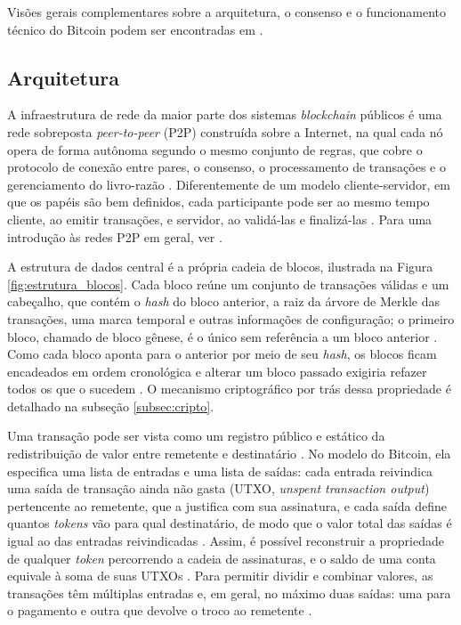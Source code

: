 Visões gerais complementares sobre a arquitetura, o consenso e o funcionamento técnico do Bitcoin podem ser encontradas em \cite{Zheng2017,Tschorsch2016}.

\subsection{Arquitetura}
\label{subsec:arquitetura}

A infraestrutura de rede da maior parte dos sistemas \textit{blockchain} públicos é uma rede sobreposta \textit{peer-to-peer} (P2P) construída sobre a Internet, na qual cada nó opera de forma autônoma segundo o mesmo conjunto de regras, que cobre o protocolo de conexão entre pares, o consenso, o processamento de transações e o gerenciamento do livro-razão \cite{Xiao2020}. Diferentemente de um modelo cliente-servidor, em que os papéis são bem definidos, cada participante pode ser ao mesmo tempo cliente, ao emitir transações, e servidor, ao validá-las e finalizá-las \cite{Xiao2020}. Para uma introdução às redes P2P em geral, ver \cite{rocha2004peer}.

A estrutura de dados central é a própria cadeia de blocos, ilustrada na Figura \ref{fig:estrutura_blocos}. Cada bloco reúne um conjunto de transações válidas e um cabeçalho, que contém o \textit{hash} do bloco anterior, a raiz da árvore de Merkle das transações, uma marca temporal e outras informações de configuração; o primeiro bloco, chamado de bloco gênese, é o único sem referência a um bloco anterior \cite{Xiao2020}. Como cada bloco aponta para o anterior por meio de seu \textit{hash}, os blocos ficam encadeados em ordem cronológica e alterar um bloco passado exigiria refazer todos os que o sucedem \cite{nakamoto2008bitcoin}. O mecanismo criptográfico por trás dessa propriedade é detalhado na subseção \ref{subsec:cripto}.



Uma transação pode ser vista como um registro público e estático da redistribuição de valor entre remetente e destinatário \cite{Xiao2020}. No modelo do Bitcoin, ela especifica uma lista de entradas e uma lista de saídas: cada entrada reivindica uma saída de transação ainda não gasta (UTXO, \textit{unspent transaction output}) pertencente ao remetente, que a justifica com sua assinatura, e cada saída define quantos \textit{tokens} vão para qual destinatário, de modo que o valor total das saídas é igual ao das entradas reivindicadas \cite{Xiao2020}. Assim, é possível reconstruir a propriedade de qualquer \textit{token} percorrendo a cadeia de assinaturas, e o saldo de uma conta equivale à soma de suas UTXOs \cite{Xiao2020}. Para permitir dividir e combinar valores, as transações têm múltiplas entradas e, em geral, no máximo duas saídas: uma para o pagamento e outra que devolve o troco ao remetente \cite{nakamoto2008bitcoin}.

